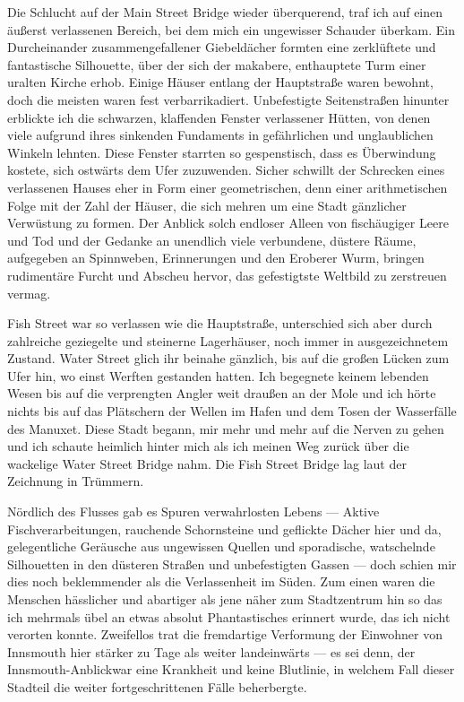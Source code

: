 Die Schlucht auf der Main Street Bridge wieder überquerend, traf ich auf einen äußerst verlassenen Bereich, bei dem mich ein ungewisser Schauder überkam. Ein Durcheinander zusammengefallener Giebeldächer formten eine zerklüftete und fantastische Silhouette, über der sich der makabere, enthauptete Turm einer uralten Kirche erhob.  Einige Häuser entlang der Hauptstraße waren bewohnt, doch die meisten waren fest verbarrikadiert. Unbefestigte Seitenstraßen hinunter erblickte ich die schwarzen, klaffenden Fenster verlassener Hütten, von denen viele aufgrund ihres sinkenden Fundaments in gefährlichen und unglaublichen Winkeln lehnten.
Diese Fenster starrten so gespenstisch, dass es Überwindung kostete, sich ostwärts dem Ufer zuzuwenden. Sicher schwillt der Schrecken eines verlassenen Hauses eher in Form einer geometrischen, denn einer arithmetischen Folge mit der Zahl der Häuser, die sich mehren um eine Stadt gänzlicher Verwüstung zu formen. Der Anblick solch endloser Alleen von fischäugiger Leere und Tod und der Gedanke an unendlich viele verbundene, düstere Räume, aufgegeben an Spinnweben, Erinnerungen und den Eroberer Wurm, bringen rudimentäre Furcht und Abscheu hervor, das gefestigtste Weltbild zu zerstreuen vermag.

Fish Street war so verlassen wie die Hauptstraße, unterschied sich aber durch zahlreiche geziegelte und steinerne Lagerhäuser, noch immer in ausgezeichnetem Zustand. Water Street glich ihr beinahe gänzlich, bis auf die großen Lücken zum Ufer hin, wo einst Werften gestanden hatten. Ich begegnete keinem lebenden Wesen bis auf die verprengten Angler weit draußen an der Mole und ich hörte nichts bis auf das Plätschern der Wellen im Hafen und dem Tosen der Wasserfälle des Manuxet. Diese Stadt begann, mir mehr und mehr auf die Nerven zu gehen und ich schaute heimlich hinter mich als ich meinen Weg zurück über die wackelige Water Street Bridge nahm. Die Fish Street Bridge lag laut der Zeichnung in Trümmern.

Nördlich des Flusses gab es Spuren verwahrlosten Lebens --- Aktive Fischverarbeitungen, rauchende Schornsteine und geflickte Dächer hier und da, gelegentliche Geräusche aus ungewissen Quellen und sporadische, watschelnde Silhouetten in den düsteren Straßen und unbefestigten Gassen --- doch schien mir dies noch beklemmender als die Verlassenheit im Süden. Zum einen waren die Menschen hässlicher und abartiger als jene näher zum Stadtzentrum hin so das ich mehrmals übel an etwas absolut Phantastisches erinnert wurde, das ich nicht verorten konnte. Zweifellos trat die fremdartige Verformung der Einwohner von Innsmouth hier stärker zu Tage als weiter landeinwärts --- es sei denn, der \glqq Innsmouth-Anblick\grqq war eine Krankheit und keine Blutlinie, in welchem Fall dieser Stadteil die weiter fortgeschrittenen Fälle beherbergte.

